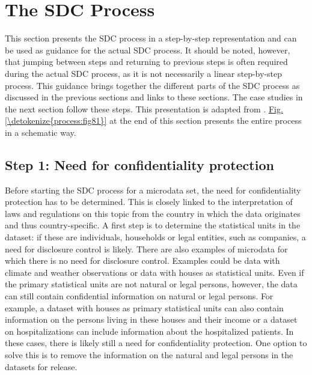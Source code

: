 \documentclass[letterpaper,10pt,english]{sphinxmanual}
\begin{document}
\chapter{The SDC Process}
\label{\detokenize{process:the-sdc-process}}\label{\detokenize{process::doc}}
This section presents the SDC process in a step-by-step representation
and can be used as guidance for the actual SDC process. It should be
noted, however, that jumping between steps and returning to previous
steps is often required during the actual SDC process, as it is not
necessarily a linear step-by-step process. This guidance brings together
the different parts of the SDC process as discussed in the previous
sections and links to these sections. The case studies in the next
section follow these steps. This presentation is adapted from  {\hyperref[\detokenize{process:hdfg12}]{}}.
\hyperref[\detokenize{process:fig81}]{Fig.\@ \ref{\detokenize{process:fig81}}} at the end of this section presents the entire
process in a schematic way.


\section{Step 1: Need for confidentiality protection}
\label{\detokenize{process:step-1-need-for-confidentiality-protection}}
Before starting the SDC process for a microdata set, the need for
confidentiality protection has to be determined. This is closely linked
to the interpretation of laws and regulations on this topic from the
country in which the data originates and thus country-specific. A first
step is to determine the statistical units in the dataset: if these are
individuals, households or legal entities, such as companies, a need for
disclosure control is likely. There are also examples of microdata for
which there is no need for disclosure control. Examples could be data
with climate and weather observations or data with houses as statistical
units. Even if the primary statistical units are not natural or legal
persons, however, the data can still contain confidential information on
natural or legal persons. For example, a dataset with houses as primary
statistical units can also contain information on the persons living in
these houses and their income or a dataset on hospitalizations can
include information about the hospitalized patients. In these cases,
there is likely still a need for confidentiality protection. One option
to solve this is to remove the information on the natural and legal
persons in the datasets for release.
\end{document}
